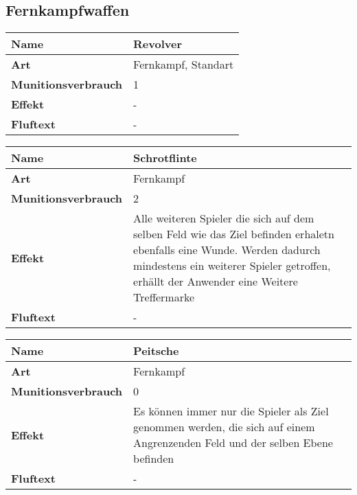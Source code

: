 


\subsection{Fernkampfwaffen}


\begin{table}[H]
  \begin{center}
    \label{tab:table1}
    \begin{tabular}{|l|p{8cm}|}
      \hline
      \textbf{Name} & Revolver \\
      \hline
      \textbf{Art} & Fernkampf, Standart \\
      \hline
      \textbf{Munitionsverbrauch} & 1 \\
      \hline
      \textbf{Effekt} & - \\
      \hline
      \textbf{Fluftext} & - \\
      \hline
    \end{tabular}
  \end{center}
\end{table}

\begin{table}[H]
  \begin{center}
    \label{tab:table1}
    \begin{tabular}{|l|p{8cm}|}
      \hline
      \textbf{Name} & Schrotflinte \\
      \hline
      \textbf{Art} & Fernkampf \\
      \hline
      \textbf{Munitionsverbrauch} & 2 \\
      \hline
      \textbf{Effekt} & Alle weiteren Spieler die sich auf dem selben Feld wie das Ziel befinden erhaletn
                        ebenfalls eine Wunde. Werden dadurch mindestens ein weiterer Spieler getroffen,
                        erhällt der Anwender eine Weitere Treffermarke \\
      \hline
      \textbf{Fluftext} & - \\
      \hline
    \end{tabular}
  \end{center}
\end{table}

\begin{table}[H]
  \begin{center}
    \label{tab:table1}
    \begin{tabular}{|l|p{8cm}|}
      \hline
      \textbf{Name} & Peitsche \\
      \hline
      \textbf{Art} & Fernkampf \\
      \hline
      \textbf{Munitionsverbrauch} & 0 \\
      \hline
      \textbf{Effekt} & Es können immer nur die Spieler als Ziel genommen werden, die sich auf einem Angrenzenden Feld
                        und der selben Ebene befinden\\
      \hline
      \textbf{Fluftext} & - \\
      \hline
    \end{tabular}
  \end{center}
\end{table}

